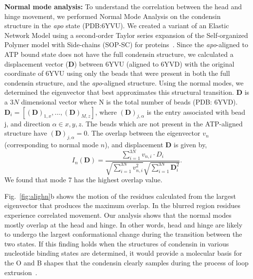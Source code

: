 \documentclass[aps,preprint]{revtex4-1}
\begin{document}
{\bf Normal mode analysis:}
To understand the correlation between the head and hinge movement, we performed Normal Mode Analysis on the condensin structure in the {\it apo} state (PDB:6YVU). We created a variant of an Elastic Network Model using a second-order Taylor series expansion of the Self-organized Polymer model with Side-chains (SOP-SC) for proteins~\cite{mugnai2020role}. Since the {\it apo}-aligned to ATP bound state does not have the full condensin structure, we calculated a displacement vector ($\textbf{D}$) between 6YVU (aligned to 6YVD) with the original coordinate of 6YVU using only the beads that were present in both the full condensin structure, and the {\it apo}-aligned structure. Using the normal modes, we determined the eigenvector that best approximates this structural transition. $\textbf{D}$ is a $3N$ dimensional vector where N is the total number of beads  (PDB: 6YVD).  $\textbf{D}_i = [(\textbf{D})_{1,x},...,(\textbf{D})_{M,z}]$,
where $(\textbf{D})_{j,\alpha}$ is the entry associated with bead j, and direction $\alpha\in {x, y, z}$. The beads which are not present in the ATP-aligned structure have $(\textbf{D})_{j,\alpha}=0$.  The overlap between the eigenvector $v_n$ (corresponding to normal mode $n$), and displacement $\textbf{D}$ is given by,
\begin{equation}
    I_n(\textbf{D}) = \frac{\sum_{i=1}^{3N} v_{n,i}\cdot D_i }{\sqrt{\sum_{i=1}^{3N} v_{n,i}^2}\sqrt{\sum_{i=1}^{3N} \textbf{D}_i^2}}.
\end{equation}
We found that mode 7 has the highest overlap value.

Fig.~\ref{fig:alighn}b shows the motion of the residues calculated from the largest eigenvector that produces the maximum overlap. In the blurred region residues experience correlated movement. Our analysis shows that the normal modes mostly overlap at the head and hinge. In other words, head and hinge are likely to undergo the largest conformational change during the transition between the two states. If this finding holds when the structures of condensin in various nucleotide binding states are determined, it would provide a molecular basis for the O and B shapes that the condensin clearly samples during the process of loop extrusion~\cite{ryu2020condensin}. %




\end{document}
